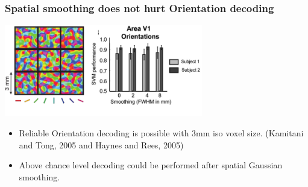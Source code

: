 \documentclass{beamer}
\begin{document}

  \begin{frame}
    \frametitle{Spatial smoothing does not hurt Orientation decoding}
        \begin{center}
            \includegraphics[height=4cm]{../pictures/grid_3mm_op_de_beeck}
        \end{center}
        \begin{itemize}
            \item Reliable Orientation decoding is possible with 3mm iso voxel size. (Kamitani and Tong, 2005 and Haynes and Rees, 2005)
            \item Above chance level decoding could be performed after spatial Gaussian smoothing.
        \end{itemize}  
    \end{frame}
\end{document}
